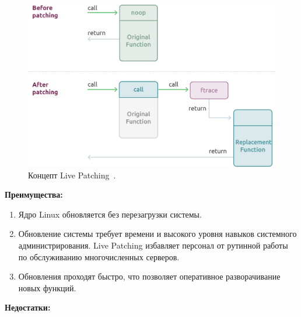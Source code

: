 \begin{figure}[H]
    \centering
    \includegraphics[scale=0.75, width=\textwidth]{inc/img/Livepatch}
    \caption{Концепт Live Patching~\cite{livepatch-pic}.}
    \label{fig:Livepatch}
\end{figure}

\textbf{Преимущества:}

\begin{enumerate}
    \item Ядро Linux обновляется без перезагрузки системы.
    \item Обновление системы требует времени и высокого уровня навыков системного администрирования.
    Live Patching избавляет персонал от рутинной работы по обслуживанию многочисленных серверов.
    \item Обновления проходят быстро, что позволяет оперативное разворачивание новых функций.
\end{enumerate}

\textbf{Недостатки:}

